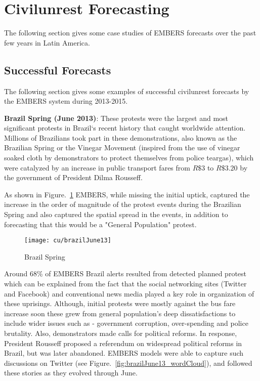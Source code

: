 \section{Civilunrest Forecasting}
The following section gives some case studies of EMBERS forecasts over
the past few years in Latin America.
\subsection{Successful Forecasts}
The following section gives some examples of successful civilunrest
forecasts by the EMBERS system during 2013-2015.

\textbf{Brazil Spring (June 2013)}: These protests were the largest and most
significant protests in Brazil`s recent history that caught worldwide
attention. Millions of Brazilians took part in these demonstrations,
also known as the Brazilian Spring or the Vinegar Movement (inspired
from the use of vinegar soaked cloth by demonstrators to protect
themselves from police teargas), which were catalyzed by an increase in
public transport fares from $R\$3$ to $R\$3.20$ by the government of President
Dilma Rousseff.

As shown in Figure.~\ref{fig:brazilJune13} EMBERS, while missing the initial uptick,
captured the increase in the order of magnitude of the protest events
during the Brazilian Spring and also captured
the spatial spread in the events, in addition to forecasting that this would be
a "General Population" protest.

\begin{figure}[H]
\texttt{[image: cu/brazilJune13]}
\caption{Brazil Spring}
\label{fig:brazilJune13}
\end{figure}

Around 68\% of EMBERS Brazil alerts resulted from detected planned
protest which can be explained from the fact that the social networking
sites (Twitter and Facebook) and conventional news media played a key
role in organization of these uprisings. Although, initial protests were
mostly against the bus fare increase soon these grew from general
population's deep dissatisfactions to include wider issues such as -
government corruption, over-spending and police brutality. Also,
demonstrators made calls for political reforms. In response, President
Rousseff proposed a referendum on widespread political reforms in
Brazil, but was later abandoned. EMBERS models were able to capture such
discussions on Twitter (see Figure.~\ref{fig:brazilJune13_wordCloud}), and followed these stories as
they evolved through June.

